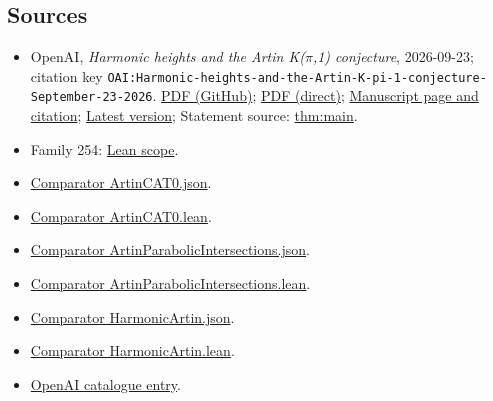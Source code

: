 \documentclass[11pt]{article}
\begin{document}
\subsection{Sources}
\begin{itemize}
\item OpenAI, \emph{Harmonic heights and the Artin K(\(\pi\),1) conjecture}, 2026-09-23; citation key \texttt{OAI:Harmonic-heights-and-the-Artin-K-pi-1-conjecture-September-23-2026}. \href{https://github.com/openai/math/blob/adc7f1241b42e322a6451854ab7e4b4c146bf78a/preprints/Harmonic-heights-and-the-Artin-K-pi-1-conjecture-September-23-2026/paper.pdf}{PDF (GitHub)}; \href{https://github.com/openai/math/raw/adc7f1241b42e322a6451854ab7e4b4c146bf78a/preprints/Harmonic-heights-and-the-Artin-K-pi-1-conjecture-September-23-2026/paper.pdf}{PDF (direct)}; \href{https://github.com/openai/math/blob/adc7f1241b42e322a6451854ab7e4b4c146bf78a/preprints/Harmonic-heights-and-the-Artin-K-pi-1-conjecture-September-23-2026/README.md}{Manuscript page and citation}; \href{https://github.com/openai/math/blob/main/preprints/Harmonic-heights-and-the-Artin-K-pi-1-conjecture-September-23-2026/paper.pdf}{Latest version}; Statement source: \href{https://github.com/openai/math/blob/adc7f1241b42e322a6451854ab7e4b4c146bf78a/preprints/Harmonic-heights-and-the-Artin-K-pi-1-conjecture-September-23-2026/build/sections/introduction.tex\#L22}{thm:main}.
\item Family 254: \href{https://github.com/openai/math/blob/adc7f1241b42e322a6451854ab7e4b4c146bf78a/lean/docs/254.md}{Lean scope}.
\item \href{https://github.com/openai/math/blob/adc7f1241b42e322a6451854ab7e4b4c146bf78a/lean/ComparatorChallenges/ArtinCAT0.json}{Comparator ArtinCAT0.json}.
\item \href{https://github.com/openai/math/blob/adc7f1241b42e322a6451854ab7e4b4c146bf78a/lean/ComparatorChallenges/ArtinCAT0.lean}{Comparator ArtinCAT0.lean}.
\item \href{https://github.com/openai/math/blob/adc7f1241b42e322a6451854ab7e4b4c146bf78a/lean/ComparatorChallenges/ArtinParabolicIntersections.json}{Comparator ArtinParabolicIntersections.json}.
\item \href{https://github.com/openai/math/blob/adc7f1241b42e322a6451854ab7e4b4c146bf78a/lean/ComparatorChallenges/ArtinParabolicIntersections.lean}{Comparator ArtinParabolicIntersections.lean}.
\item \href{https://github.com/openai/math/blob/adc7f1241b42e322a6451854ab7e4b4c146bf78a/lean/ComparatorChallenges/HarmonicArtin.json}{Comparator HarmonicArtin.json}.
\item \href{https://github.com/openai/math/blob/adc7f1241b42e322a6451854ab7e4b4c146bf78a/lean/ComparatorChallenges/HarmonicArtin.lean}{Comparator HarmonicArtin.lean}.
\item \href{https://github.com/openai/math/blob/adc7f1241b42e322a6451854ab7e4b4c146bf78a/CONTENTS.md}{OpenAI catalogue entry}.
\end{itemize}
\end{document}

